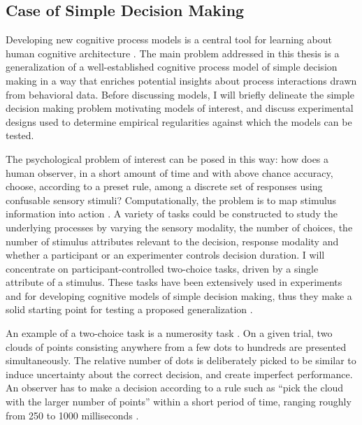 \documentclass[12pt]{article}
\begin{document}
\subsection{Case of Simple Decision Making}

Developing new cognitive process models is a central tool for learning
about human cognitive architecture
\citep{BusDie2010,LewFar2010,LeeWag2014}. The main problem addressed in
this thesis is a generalization of a well-established cognitive process
model of simple decision making in a way that enriches potential insights
about process interactions drawn from behavioral data. Before discussing
models, I will briefly delineate the simple decision making problem
motivating models of interest, and discuss experimental designs used to
determine empirical regularities against which the models can be tested.
    
The psychological problem of interest can be posed in this way: how does a
human observer, in a short amount of time and with above chance accuracy,
choose, according to a preset rule, among a discrete set of responses using
confusable sensory stimuli? Computationally, the problem is to map stimulus
information into action \citep{Vic1979,BogBro2006}. A variety of tasks
could be constructed to study the underlying processes by varying
the sensory modality, the number of choices, the number of stimulus
attributes relevant to the decision, response modality and whether a
participant or an experimenter controls decision duration. I will concentrate
on participant-controlled two-choice tasks, driven by a
single attribute of a stimulus. These tasks have been extensively
used in experiments and for developing cognitive models of simple decision
making, thus they make a solid starting point for testing a proposed generalization
\citep{Luc1986,RatSmi2004,RatMck2008,Wag2009}.
    
An example of a two-choice task is a numerosity task \citep{RatLov2012}. On
a given trial, two clouds of points consisting anywhere from a few dots to
hundreds are presented simultaneously. The relative number of dots is
deliberately picked to be similar to induce uncertainty about the correct
decision, and create imperfect performance. An observer has to make a
decision according to a rule such as ``pick the cloud with the larger
number of points'' within a short period of time, ranging roughly from 250
to 1000 milliseconds \citep{RatLov2012}.
    
\end{document}
